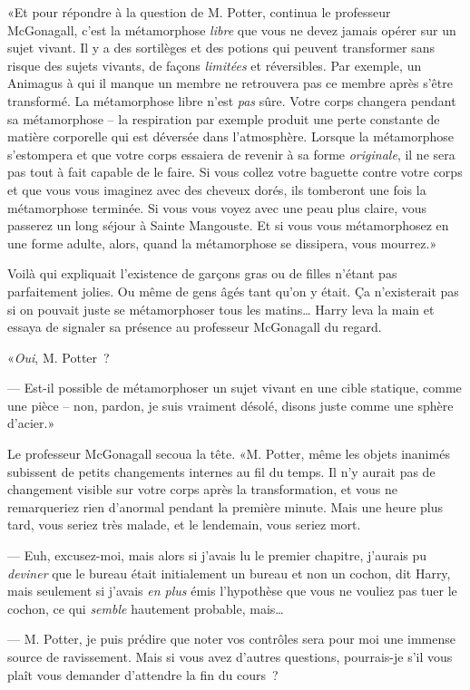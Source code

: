 «Et pour répondre à la question de M. Potter, continua le professeur McGonagall, c'est la métamorphose \emph{libre} que vous ne devez jamais opérer sur un sujet vivant. Il y a des sortilèges et des potions qui peuvent transformer sans risque des sujets vivants, de façons \emph{limitées} et réversibles. Par exemple, un Animagus à qui il manque un membre ne retrouvera pas ce membre après s'être transformé. La métamorphose libre n'est \emph{pas} sûre. Votre corps changera pendant sa métamorphose -- la respiration par exemple produit une perte constante de matière corporelle qui est déversée dans l'atmosphère. Lorsque la métamorphose s'estompera et que votre corps essaiera de revenir à sa forme \emph{originale}, il ne sera pas tout à fait capable de le faire. Si vous collez votre baguette contre votre corps et que vous vous imaginez avec des cheveux dorés, ils tomberont une fois la métamorphose terminée. Si vous vous voyez avec une peau plus claire, vous passerez un long séjour à Sainte Mangouste. Et si vous vous métamorphosez en une forme adulte, alors, quand la métamorphose se dissipera, vous mourrez.»

Voilà qui expliquait l'existence de garçons gras ou de filles n'étant pas parfaitement jolies. Ou même de gens âgés tant qu'on y était. Ça n'existerait pas si on pouvait juste se métamorphoser tous les matins… Harry leva la main et essaya de signaler sa présence au professeur McGonagall du regard.

«\emph{Oui}, M. Potter~?

--- Est-il possible de métamorphoser un sujet vivant en une cible statique, comme une pièce -- non, pardon, je suis vraiment désolé, disons juste comme une sphère d'acier.»

Le professeur McGonagall secoua la tête. «M. Potter, même les objets inanimés subissent de petits changements internes au fil du temps. Il n'y aurait pas de changement visible sur votre corps après la transformation, et vous ne remarqueriez rien d'anormal pendant la première minute. Mais une heure plus tard, vous seriez très malade, et le lendemain, vous seriez mort.

--- Euh, excusez-moi, mais alors si j'avais lu le premier chapitre, j'aurais pu \emph{deviner} que le bureau était initialement un bureau et non un cochon, dit Harry, mais seulement si j'avais \emph{en plus} émis l'hypothèse que vous ne vouliez pas tuer le cochon, ce qui \emph{semble} hautement probable, mais…

--- M. Potter, je puis prédire que noter vos contrôles sera pour moi une immense source de ravissement. Mais si vous avez d'autres questions, pourrais-je s'il vous plaît vous demander d'attendre la fin du cours~?

